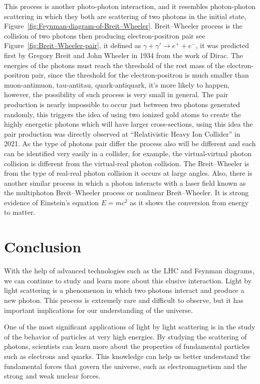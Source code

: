 \documentclass{article}
\begin{document}
This process is another photo-photon interaction, and it resembles photon-photon scattering in which they both are scattering of two photons in the initial state, Figure~\ref{fig:Feynman-diagram-of-Breit–Wheeler}.
Breit–Wheeler process is the collision of two photons then producing electron-positron pair see Figure~\ref{fig:Breit–Wheeler-pair}, it defined as
 $\gamma + \gamma' \rightarrow e^+ + e^-$, it was predicted first by Gregory Breit and John Wheeler in 1934 from the work of Dirac.
The energies of the photons must reach the threshold of the rest mass of the electron-positron pair, since the threshold for the electron-positron is much smaller than muon-antimuon, tau-antitau, quark-antiquark, it’s more likely to happen, however, the possibility of such process is very small in general.
The pair production is nearly impossible to occur just between two photons generated randomly, this triggers the idea of using two ionized gold atoms to create the highly energetic photons which will have larger cross-sections, using this idea the pair production was directly observed at “Relativistic Heavy Ion Collider” in 2021.
As the type of photons pair differ the process also will be different and each can be identified very easily in a collider, for example, the virtual-virtual photon collision is different from the virtual-real photon collision. The Breit–Wheeler is from the type of real-real photon collision it occurs at large angles. Also, there is another similar process in which a photon interacts with a laser field known as the multiphoton Breit–Wheeler process or nonlinear Breit–Wheeler.
It is strong evidence of Einstein’s equation $E=mc^2$ as it shows the conversion from energy to matter.



\section{Conclusion}
With the help of advanced technologies such as the LHC and Feynman diagrams, we can continue to study and learn more about this elusive interaction.
Light by light scattering is a phenomenon in which two photons interact and produce a new photon. This process is extremely rare and difficult to observe, but it has important implications for our understanding of the universe.

One of the most significant applications of light by light scattering is in the study of the behavior of particles at very high energies. By studying the scattering of photons, scientists can learn more about the properties of fundamental particles such as electrons and quarks. This knowledge can help us better understand the fundamental forces that govern the universe, such as electromagnetism and the strong and weak nuclear forces.
\end{document}
